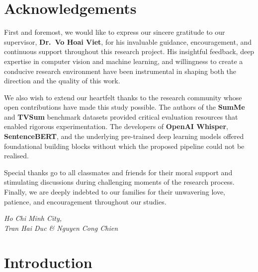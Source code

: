 \documentclass[12pt, a4paper]{report}
\begin{document}
\chapter*{Acknowledgements}
\thispagestyle{fancy}

First and foremost, we would like to express our sincere gratitude to our supervisor,
\textbf{Dr.\ Vo Hoai Viet}, for his invaluable guidance, encouragement, and continuous
support throughout this research project. His insightful feedback, deep expertise in
computer vision and machine learning, and willingness to create a conducive research
environment have been instrumental in shaping both the direction and the quality of
this work.

We also wish to extend our heartfelt thanks to the research community whose open
contributions have made this study possible. The authors of the \textbf{SumMe} and
\textbf{TVSum} benchmark datasets provided critical evaluation resources that enabled
rigorous experimentation. The developers of \textbf{OpenAI Whisper}, \textbf{SentenceBERT},
and the underlying pre-trained deep learning models offered foundational building blocks
without which the proposed pipeline could not be realised.

Special thanks go to all classmates and friends for their moral support and stimulating
discussions during challenging moments of the research process. Finally, we are deeply
indebted to our families for their unwavering love, patience, and encouragement
throughout our studies.

\vspace{1.5cm}
\begin{flushright}
  \textit{Ho Chi Minh City, \the\year}\\[6pt]
  \textit{Tran Hai Duc \& Nguyen Cong Chien}
\end{flushright}

\newpage

\tableofcontents
\newpage

\chapter{Introduction}
\end{document}
